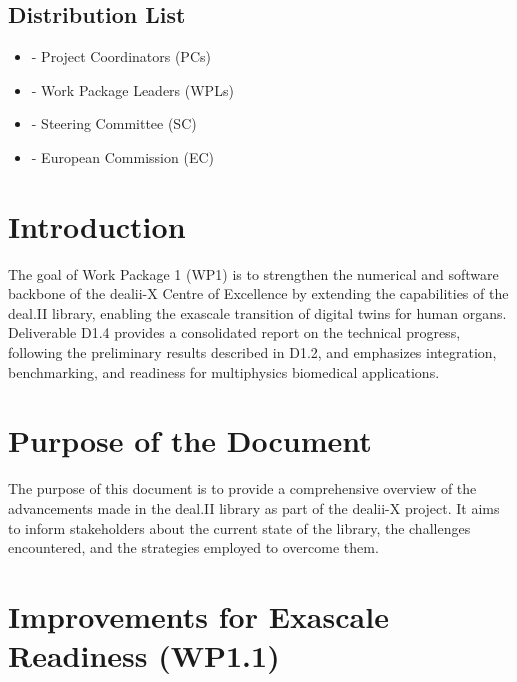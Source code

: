 \documentclass[a4paper,12pt]{article}
\begin{document}
\subsection*{{Distribution List}}
\begin{itemize}
    \item [] - Project Coordinators (PCs)
    \item [] - Work Package Leaders (WPLs)
    \item [] - Steering Committee (SC)
    \item [] - European Commission (EC)
\end{itemize}

\vspace*{2cm}

\disclaimer

\newpage

\tableofcontents %

\newpage

\section{{Introduction}}

The goal of Work Package 1 (WP1) is to strengthen the numerical and software backbone of the dealii-X Centre of Excellence by extending the capabilities of the deal.II library, enabling the exascale transition of digital twins for human organs. Deliverable D1.4 provides a consolidated report on the technical progress, following the preliminary results described in D1.2, and emphasizes integration, benchmarking, and readiness for multiphysics biomedical applications.

\section{{Purpose of the Document}}

The purpose of this document is to provide a comprehensive overview of the advancements made in the deal.II library as part of the dealii-X project. It aims to inform stakeholders about the current state of the library, the challenges encountered, and the strategies employed to overcome them.

\section{Improvements for Exascale Readiness (WP1.1)}
\label{sec:section2}
\end{document}
